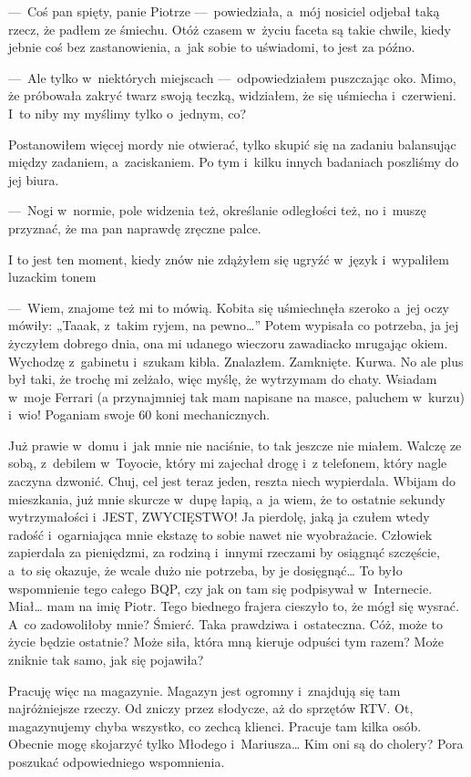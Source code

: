 ---~Coś pan spięty, panie Piotrze ---~powiedziała, a~mój nosiciel odjebał taką rzecz, że padłem ze śmiechu. Otóż czasem w~życiu faceta są takie chwile, kiedy jebnie coś bez zastanowienia, a~jak sobie to uświadomi, to jest za późno.

---~Ale tylko w~niektórych miejscach ---~odpowiedziałem puszczając oko. Mimo, że próbowała zakryć twarz swoją teczką, widziałem, że się uśmiecha i~czerwieni. I~to niby my myślimy tylko o~jednym, co? 

Postanowiłem więcej mordy nie otwierać, tylko skupić się na zadaniu balansując między zadaniem, a~zaciskaniem. Po tym i~kilku innych badaniach poszliśmy do jej biura. 

---~Nogi w~normie, pole widzenia też, określanie odległości też, no i~muszę przyznać, że ma pan naprawdę zręczne palce.

I to jest ten moment, kiedy znów nie zdążyłem się ugryźć w~język i~wypaliłem luzackim tonem 

---~Wiem, znajome też mi to mówią. Kobita się uśmiechnęła szeroko a~jej oczy mówiły: „Taaak, z~takim ryjem, na pewno…” Potem wypisała co potrzeba, ja jej życzyłem dobrego dnia, ona mi udanego wieczoru zawadiacko mrugając okiem. Wychodzę z~gabinetu i~szukam kibla. Znalazłem. Zamknięte. Kurwa. No ale plus był taki, że trochę mi zelżało, więc myślę, że wytrzymam do chaty. Wsiadam w~moje Ferrari (a przynajmniej tak mam napisane na masce, paluchem w~kurzu) i~wio! Poganiam swoje 60 koni mechanicznych. 

Już prawie w~domu i~jak mnie nie naciśnie, to tak jeszcze nie miałem. Walczę ze sobą, z~debilem w~Toyocie, który mi zajechał drogę i~z telefonem, który nagle zaczyna dzwonić. Chuj, cel jest teraz jeden, reszta niech wypierdala. Wbijam do mieszkania, już mnie skurcze w~dupę łapią, a~ja wiem, że to ostatnie sekundy wytrzymałości i~JEST, ZWYCIĘSTWO! Ja pierdolę, jaką ja czułem wtedy radość i~ogarniająca mnie ekstazę to sobie nawet nie wyobrażacie. Człowiek zapierdala za pieniędzmi, za rodziną i~innymi rzeczami by osiągnąć szczęście, a~to się okazuje, że wcale dużo nie potrzeba, by je dosięgnąć… To było wspomnienie tego całego BQP, czy jak on tam się podpisywał w~Internecie. Miał… mam na imię Piotr. Tego biednego frajera cieszyło to, że mógł się wysrać. A~co zadowoliłoby mnie? Śmierć. Taka prawdziwa i~ostateczna. Cóż, może to życie będzie ostatnie? Może siła, która mną kieruje odpuści tym razem? Może zniknie tak samo, jak się pojawiła?

Pracuję więc na magazynie. Magazyn jest ogromny i~znajdują się tam najróżniejsze rzeczy. Od zniczy przez słodycze, aż do sprzętów RTV. Ot, magazynujemy chyba wszystko, co zechcą klienci. Pracuje tam kilka osób. Obecnie mogę skojarzyć tylko Młodego i~Mariusza… Kim oni są do cholery? Pora poszukać odpowiedniego wspomnienia.

